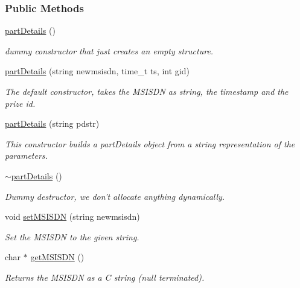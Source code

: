 \subsubsection*{Public Methods}
\begin{CompactItemize}
\item 
\hyperlink{classpartDetails_partDetailsa0}{part\-Details} ()
\begin{CompactList}\small\item\em dummy constructor that just creates an empty structure.\item\end{CompactList}\item 
\hyperlink{classpartDetails_partDetailsa1}{part\-Details} (string newmsisdn, time\_\-t ts, int gid)
\begin{CompactList}\small\item\em The default constructor, takes the MSISDN as string, the timestamp and the prize id.\item\end{CompactList}\item 
\hyperlink{classpartDetails_partDetailsa2}{part\-Details} (string pdstr)
\begin{CompactList}\small\item\em This constructor builds a part\-Details object from a string representation of the parameters.\item\end{CompactList}\item 
\hyperlink{classpartDetails_partDetailsa3}{$\sim$part\-Details} ()
\begin{CompactList}\small\item\em Dummy destructor, we don't allocate anything dynamically.\item\end{CompactList}\item 
void \hyperlink{classpartDetails_partDetailsa4}{set\-MSISDN} (string newmsisdn)
\begin{CompactList}\small\item\em Set the MSISDN to the given string.\item\end{CompactList}\item 
char $\ast$ \hyperlink{classpartDetails_partDetailsa5}{get\-MSISDN} ()
\begin{CompactList}\small\item\em Returns the MSISDN as a C string (null terminated).\item\end{CompactList}\item 

\end{CompactItemize}
